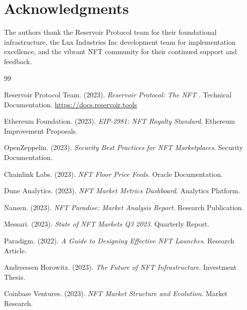 \section*{Acknowledgments}


The authors thank the Reservoir Protocol team for their foundational infrastructure, the Lux Industries Inc development team for implementation excellence, and the vibrant NFT community for their continued support and feedback.

\begin{thebibliography}{99}

Reservoir Protocol Team. (2023). \textit{Reservoir Protocol: The NFT }. Technical Documentation. \url{https://docs.reservoir.tools}

Ethereum Foundation. (2023). \textit{EIP-2981: NFT Royalty Standard}. Ethereum Improvement Proposals.

OpenZeppelin. (2023). \textit{Security Best Practices for NFT Marketplaces}. Security Documentation.

Chainlink Labs. (2023). \textit{NFT Floor Price Feeds}. Oracle Documentation.

Dune Analytics. (2023). \textit{NFT Market Metrics Dashboard}. Analytics Platform.

Nansen. (2023). \textit{NFT Paradise: Market Analysis Report}. Research Publication.

Messari. (2023). \textit{State of NFT Markets Q3 2023}. Quarterly Report.

Paradigm. (2022). \textit{A Guide to Designing Effective NFT Launches}. Research Article.

Andreessen Horowitz. (2023). \textit{The Future of NFT Infrastructure}. Investment Thesis.

Coinbase Ventures. (2023). \textit{NFT Market Structure and Evolution}. Market Research.

\end{thebibliography}

